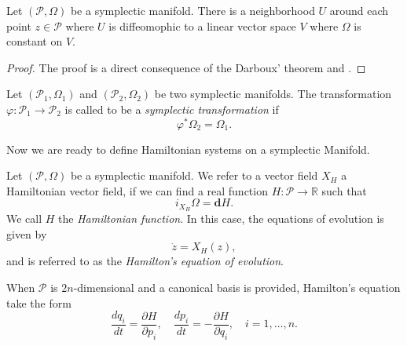 \begin{corollary} \label{theorem:2.8}
Let $(\mathcal P, \Omega)$ be a symplectic manifold. There is a neighborhood $U$ around each point $z\in \mathcal P$ where $U$ is diffeomophic to a linear vector space $V$ where $\Omega$ is constant on $V$.
\end{corollary}
\begin{proof}
The proof is a direct consequence of the Darboux' theorem and .
\end{proof}

\begin{definition}
Let $(\mathcal P_1,\Omega_1)$ and $(\mathcal P_2,\Omega_2)$ be two symplectic manifolds. The transformation $\varphi:\mathcal P_1 \to \mathcal P_2$ is called to be a \emph{symplectic transformation} if
\begin{equation} \label{eq:2.16}
	\varphi^* \Omega_2 = \Omega_1.
\end{equation}
\end{definition}

Now we are ready to define Hamiltonian systems on a symplectic Manifold.

\begin{definition}
Let $(\mathcal P,\Omega)$ be a symplectic manifold. We refer to a vector field $X_H$ a Hamiltonian vector field, if we can find a real function $H:\mathcal P \to \mathbb R$ such that
\begin{equation} \label{eq:2.17}
	i_{X_H}\Omega = \mathbf d H.
\end{equation}
We call $H$ the \emph{Hamiltonian function}. In this case, the equations of evolution is given by
\begin{equation} \label{eq:2.18}
	\dot z = X_H(z),
\end{equation}
and is referred to as the \emph{Hamilton's equation of evolution}.
\end{definition}
When $\mathcal P$ is $2n$-dimensional and a canonical basis is provided, Hamilton's equation take the form
\begin{equation} \label{eq:2.19}
	\frac{dq_i}{dt} = \frac{\partial H}{\partial p_i}, \quad \frac{dp_i}{dt} = - \frac{\partial H}{\partial q_i}, \quad i=1,\dots,n .
\end{equation}

